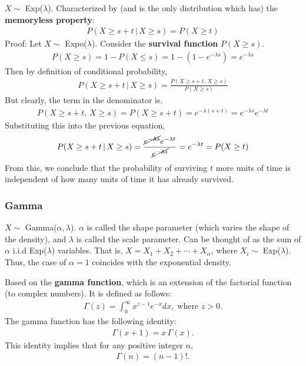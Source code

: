 \documentclass[a4paper,10pt]{article}
\begin{document}
$X \sim$ Exp($\lambda$). Characterized by (and is the only distribution which has) the \textbf{memoryless property}: 
\begin{align*}
    P(X \geq s+t\,|\,X\geq s) = P(X\geq t)
\end{align*}
Proof: Let $X \sim$ Expo($\lambda$). Consider the \textbf{survival function} $P(X\geq s)$.
\begin{align*}
    P(X\geq s) = 1-P(X\leq s) = 1-(1-e^{-\lambda s}) = e^{-\lambda s}
\end{align*}
Then by definition of conditional probability, 
\begin{align*}
    P(X\geq s+t\,|\,X\geq s) = \frac{P(X\geq s+t,\,X\geq s)}{P(X\geq s)}
\end{align*}
But clearly, the term in the denominator is, 
\begin{align*}
    P(X\geq s+t,\,X\geq s) = P(X\geq s+t) = e^{-\lambda(s+t)} = e^{-\lambda s}e^{-\lambda t}
\end{align*}
Substituting this into the previous equation, 
\begin{align*}
    P(X\geq s+t\,|\,X\geq s) = \frac{\cancel{e^{-\lambda s}}e^{-\lambda t}}{\cancel{e^{-\lambda s}}} = e^{-\lambda t} = P(X\geq t)
\end{align*}
From this, we conclude that the probability of surviving $t$ more units of time is independent of how many units of time it has already survived. 

\subsubsection{Gamma}

$X \sim$ Gamma($\alpha, \lambda$). $\alpha$ is called the shape parameter (which varies the shape of the density), and $\lambda$ is called the scale parameter. Can be thought of as the sum of $\alpha$ i.i.d Exp($\lambda$) variables. That is, $X = X_1 + X_2 + \cdots + X_\alpha$, where $X_i\sim$ Exp($\lambda$). Thus, the case of $\alpha=1$ coincides with the exponential density.

Based on the \textbf{gamma function}, which is an extension of the factorial function (to complex numbers). It is defined as follows: 
\begin{align*}
    \Gamma(z) = \int_0^{\infty} x^{z-1}e^{-x}dx,\;\text{where $z>0$}.
\end{align*}
The gamma function has the following identity:
\begin{align*}
    \Gamma(x+1) = x\,\Gamma(x).
\end{align*}
This identity implies that for any positive integer $n$, 
\begin{align*}
    \Gamma(n) = (n-1)!.
\end{align*}
\end{document}
